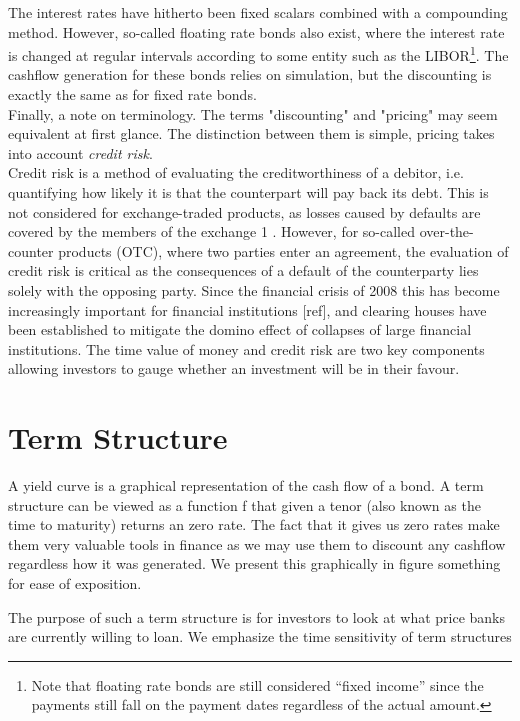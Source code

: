 The interest rates have hitherto been fixed scalars combined with a compounding 
method. However, so-called floating rate bonds also exist, where the interest 
rate is changed at regular intervals according to some entity such as the 
LIBOR\footnote{Note that floating rate bonds are still considered “fixed 
income” since the payments still fall on the payment dates regardless of the 
actual amount.}. The cashflow generation for these bonds relies on simulation, 
but the discounting is exactly the same as for fixed rate bonds.\\

Finally, a note on terminology. The terms "discounting" and "pricing" 
may seem equivalent at first glance. The distinction between them is simple, 
pricing takes into account \emph{credit risk}. \\

Credit risk is a method of evaluating the creditworthiness of a debitor, i.e. 
quantifying
how likely it is that the counterpart will pay back its debt. This is not 
considered for
exchange-traded products, as losses caused by defaults are covered by the 
members of the exchange 1 . However, for so-called over-the-counter products 
(OTC), where two parties enter an agreement, the evaluation of credit risk is 
critical as the consequences of a default of the counterparty lies solely with 
the opposing party. Since the financial crisis of 2008 this has become 
increasingly important for financial institutions [ref], and clearing houses 
have been established to mitigate the domino effect of collapses of large 
financial institutions. The time value of money and credit risk are two key 
components allowing investors to gauge whether an investment will be in their 
favour.

\section{Term Structure}

A yield curve is a graphical representation of the cash flow of a bond.
A term structure can be viewed as a function f that given a tenor (also known 
as the time to maturity) returns an zero rate. The fact that it gives us zero 
rates make them very valuable tools in finance as we may use them to discount 
any cashflow regardless how it was generated.
We present this graphically in figure something for ease of exposition.

The purpose of such a term structure is for investors to look at what price 
banks are currently willing to loan. We emphasize the time sensitivity of term 
structures

